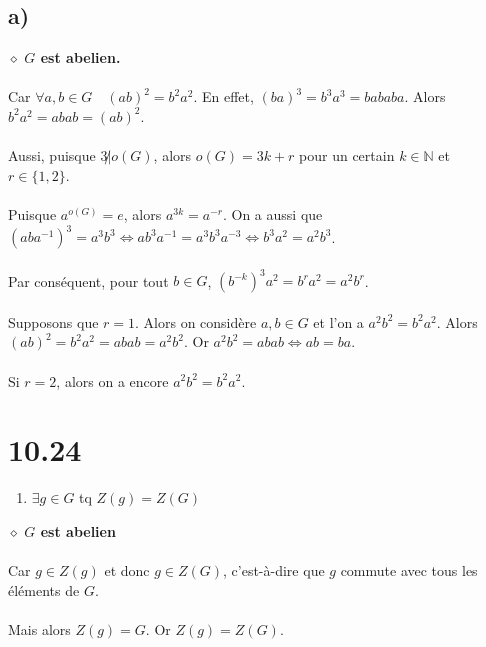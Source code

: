 \documentclass[a4paper,10pt]{article}
\begin{document}
\subsection*{a)}
$\diamond$ \textbf{$G$ est abelien.}
\\
\\
Car $\forall a,b \in G \quad (ab)^2 = b^2a^2$. En effet, $(ba)^3 = b^3 a^3 = bababa$. Alors $b^2 a^2 = abab = (ab)^2$.
\\
\\
Aussi, puisque $3 \not | o(G)$, alors $o(G) = 3k + r$ pour un certain $k \in \mathbb{N}$ et $r \in \{1,2\}$.
\\
\\
Puisque $a^{o(G)} = e$, alors $a^{3k} = a^{-r}$. On a aussi que $(aba^{-1})^3 = a^3b^3 \Leftrightarrow ab^3a^{-1} = a^3b^3a^{-3} 
\Leftrightarrow b^3a^2 = a^2b^3$.
\\
\\
Par conséquent, pour tout $b \in G$, $(b^{-k})^3 a^2 = b^r a^2 = a^2 b^r$.
\\
\\
Supposons que $r =1$. Alors on considère $a,b \in G$ et l'on a $a^2 b^2 = b^2 a^2$. Alors 
$(ab)^2 = b^2 a^2 = abab = a^2 b^2$. Or $a^2 b^2 = abab \Leftrightarrow ab = ba$.
\\
\\
Si $r = 2$, alors on a encore $a^2 b^2 = b^2 a^2$.

\section*{10.24}
\begin{enumerate}
 \item $\exists g \in G$ tq $Z(g) = Z(G)$
\end{enumerate}
$\diamond$ \textbf{$G$ est abelien}
\\
\\
Car $g \in Z(g)$ et donc $g \in Z(G)$, c'est-à-dire que $g$ commute avec tous les éléments de $G$.
\\
\\
Mais alors $Z(g) = G$. Or $Z(g) = Z(G)$. 
\end{document}
